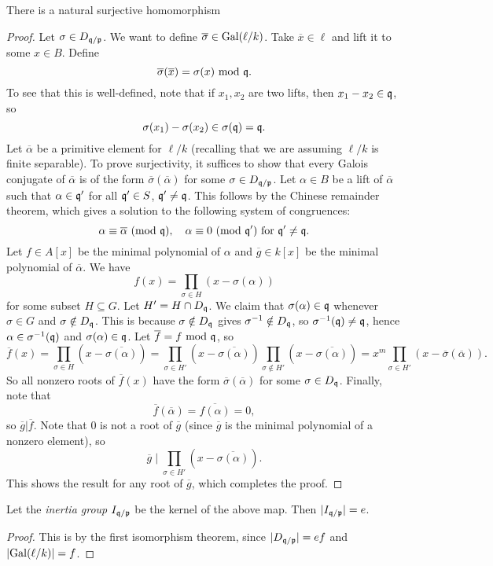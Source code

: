 \begin{theorem}[Frobenius]
  There is a natural surjective homomorphism
  \begin{center}
  \end{center}
\end{theorem}

\begin{proof}
  Let $\sigma \in D_{\mathfrak{q} / \mathfrak{p}}$. We want to define
  $\overline{\sigma} \in \operatorname{Gal}(\ell / k)$. Take
  $\overline{x} \in \ell$ and lift it to some $x \in B$.
  Define
  \[
    \overline{\sigma}(\overline{x}) = \sigma(x) \ {\mathrm{mod}\ \mathfrak{q}}.
  \]
  To see that this is well-defined, note that if
  $x_1, x_2$ are two lifts, then
  $x_1 - x_2 \in \mathfrak{q}$, so
  \[
    \sigma(x_1) - \sigma(x_2) \in \sigma(\mathfrak{q}) = \mathfrak{q}.
  \]
  Let $\overline{\alpha}$ be a primitive element
  for $\ell / k$ (recalling that we are assuming
  $\ell / k$ is finite separable). To
  prove surjectivity, it suffices to show that every
  Galois conjugate of $\overline{\alpha}$ is of the
  form $\overline{\sigma}(\overline{\alpha})$ for some
  $\sigma \in D_{\mathfrak{q} / \mathfrak{p}}$. Let $\alpha \in B$
  be a lift of $\overline{\alpha}$ such that
  $\alpha \in \mathfrak{q}'$ for all $\mathfrak{q}' \in S$, $\mathfrak{q}' \ne \mathfrak{q}$.
  This follows by the Chinese remainder theorem, which
  gives a solution to the following system of
  congruences:
  \[
    \alpha \equiv \overline{\alpha} \ (\mathrm{mod}\ \mathfrak{q}), \quad
    \alpha \equiv 0 \ (\mathrm{mod}\ \mathfrak{q}') \text{ for } \mathfrak{q}' \ne \mathfrak{q}.
  \]
  Let $f \in A[x]$ be the minimal polynomial of
  $\alpha$ and $\overline{g} \in k[x]$ be the
  minimal polynomial of $\overline{\alpha}$. We have
  \[
    f(x) = \prod_{\sigma \in H} (x - \sigma(\alpha))
  \]
  for some subset $H \subseteq G$. Let
  $H' = H \cap D_{\mathfrak{q}}$. We claim that
  $\sigma(\alpha) \in \mathfrak{q}$ whenever $\sigma \in G$
  and $\sigma \notin D_{\mathfrak{q}}$. This is because
  $\sigma \notin D_{\mathfrak{q}}$ gives $\sigma^{-1} \notin D_{\mathfrak{q}}$,
  so $\sigma^{-1} (\mathfrak{q}) \ne \mathfrak{q}$, hence
  $\alpha \in \sigma^{-1}(\mathfrak{q})$ and
  $\sigma(\alpha) \in \mathfrak{q}$.
  Let $\overline{f} = f \ {\mathrm{mod}\ \mathfrak{q}}$, so
  \[
    \overline{f}(x)
    = \prod_{\sigma \in H} (x - \overline{\sigma(\alpha)})
    = \prod_{\sigma \in H'} (x - \overline{\sigma(\alpha)})
    \prod_{\sigma \notin H'} (x - \overline{\sigma(\alpha)})
    = x^m \prod_{\sigma \in H'} (x - \overline{\sigma}(\overline{\alpha})).
  \]
  So all nonzero roots of $\overline{f}(x)$ have
  the form $\overline{\sigma}(\overline{\alpha})$ for
  some $\sigma \in D_{\mathfrak{q}}$. Finally, note that
  \[
    \overline{f}(\overline{\alpha})
    = \overline{f(\alpha)} = 0,
  \]
  so $\overline{g} | \overline{f}$. Note that $0$ is
  not a root of $\overline{g}$ (since $\overline{g}$
  is the minimal polynomial of a nonzero element), so
  \[
    \overline{g} \mid \prod_{\sigma \in H'} (x - \overline{\sigma(\alpha)}).
  \]
  This shows the result for any root of
  $\overline{g}$, which completes the proof.
\end{proof}

\begin{corollary}
  Let the \emph{inertia group} $I_{\mathfrak{q} / \mathfrak{p}}$ be the
  kernel of the above map. Then $|I_{\mathfrak{q} / \mathfrak{p}}| = e$.
\end{corollary}

\begin{proof}
  This is by the first isomorphism theorem, since
  $|D_{\mathfrak{q} / \mathfrak{p}}| = ef$ and $|{\operatorname{Gal}(\ell / k)}| = f$.
\end{proof}
